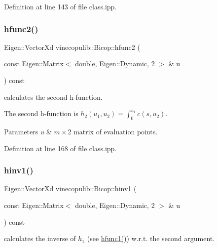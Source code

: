 Definition at line 143 of file class.\+ipp.

\mbox{\label{classvinecopulib_1_1_bicop_a9bbf2e9ab9a04a45e8d98206a46b7596}} 
\subsubsection{\texorpdfstring{hfunc2()}{hfunc2()}}
{\footnotesize\ttfamily Eigen\+::\+Vector\+Xd vinecopulib\+::\+Bicop\+::hfunc2 (\begin{DoxyParamCaption}\item[{const Eigen\+::\+Matrix$<$ double, Eigen\+::\+Dynamic, 2 $>$ \&}]{u }\end{DoxyParamCaption}) const\hspace{0.3cm}{\ttfamily [inline]}}



calculates the second h-\/function. 

The second h-\/function is $ h_2(u_1, u_2) = \int_0^{u_1} c(s, u_2) $. 
\begin{DoxyParams}{Parameters}
{\em u} & $m \times 2$ matrix of evaluation points. \\
\hline
\end{DoxyParams}


Definition at line 168 of file class.\+ipp.

\mbox{\label{classvinecopulib_1_1_bicop_aa4c7814cd1728ecf4c965aed5499968f}} 
\subsubsection{\texorpdfstring{hinv1()}{hinv1()}}
{\footnotesize\ttfamily Eigen\+::\+Vector\+Xd vinecopulib\+::\+Bicop\+::hinv1 (\begin{DoxyParamCaption}\item[{const Eigen\+::\+Matrix$<$ double, Eigen\+::\+Dynamic, 2 $>$ \&}]{u }\end{DoxyParamCaption}) const\hspace{0.3cm}{\ttfamily [inline]}}



calculates the inverse of $ h_1 $ (see \hyperlink{classvinecopulib_1_1_bicop_ae6d42fab3bc19b807f41ccecfc80de46}{hfunc1()}) w.\+r.\+t. the second argument. 


